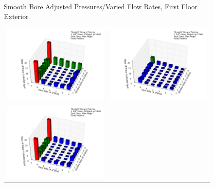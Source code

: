 \documentclass{article}
\begin{document}
\begin{appendices}
\begin{figure}[ht]
\begin{tabular*}{\textwidth}{lr}
\end{tabular*}
\caption{Smooth Bore Adjusted Pressures/Varied Flow Rates, First Floor Exterior}
\label{fig:Smooth Bore Adjusted Pressures/Varied Flow Rates, First Floor Exterior}
\end{figure}

\clearpage

\begin{figure}[ht]
\begin{tabular*}{\textwidth}{lr}
\includegraphics[width=3.2in]{../ADD_Analysis/Figures/15-12-08_160630_Datafile_Straight_Stream_Exterior.png} &
\includegraphics[width=3.2in]{../ADD_Analysis/Figures/15-12-08_161540_Datafile_Straight_Stream_Exterior.png} \\
\includegraphics[width=3.2in]{../ADD_Analysis/Figures/15-12-08_162126_Datafile_Straight_Stream_Exterior.png} &

\end{tabular*}
\end{figure}
\end{appendices}
\end{document}
